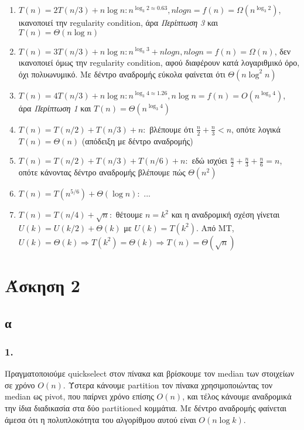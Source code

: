 \documentclass[12pt,a4paper]{article}
\begin{document}
    \begin{enumerate}
      \item \( T(n) = 2T(n/3) + n\log{n} : n^{\log_{3}2 \approx 0.63 }, 
      nlogn = f(n) = \Omega(n^{\log_{3}2}) \), ικανοποιεί την {\latintext 
      regularity condition}, άρα \textit{Περίπτωση 3} και \( T(n)=\Theta(n\log{n}) \)
      \item \( T(n) = 3T(n/3) + n\log{n} : n^{\log_{3}3} + nlogn, nlogn = 
      f(n) = \Omega(n) \), δεν ικανοποιεί όμως την {\latintext regularity 
      condition}, αφού διαφέρουν κατά λογαριθμικό όρο, όχι πολυωνυμικό. Με δέντρο αναδρομής εύκολα φαίνεται ότι \( \Theta(n\log^{2}{n}) \)
      \item \( T(n) = 4T(n/3) + n\log{n} : n^{\log_{3}{4} \approx 1.26}, n\log{n} =
      f(n) = O(n^{\log_{3}4}) \), άρα \textit{Περίπτωση 1} και \( Τ(n) = \Theta(n^{\log_{3}{4}}) \)
      \item \( T(n) = T(n/2) + T(n/3) + n : \) βλέπουμε ότι \( \frac{n}{2} + 
      \frac{n}{3} < n \), οπότε λογικά \( T(n) = \Theta(n) \) (απόδειξη με δέντρο αναδρομής)
      \item \( Τ(n) = T(n/2) + T(n/3) + T(n/6) + n : \) εδώ ισχύει \( \frac{n}{2} 
      + \frac{n}{3} + \frac{n}{6} = n \), οπότε κάνοντας δέντρο αναδρομής βλέπουμε
      πώς \( \Theta(n^2) \) 
      \item \( T(n) = T(n^{5/6}) + \Theta(\log{n}) : \) ...
      \item \( T(n) = T(n/4) + \sqrt{n} : \) θέτουμε \(n=k^2\) και η αναδρομική 
      σχέση γίνεται \( U(k) = U(k/2) + \Theta(k) \) με \( U(k)=T(k^2) \). Από 
      {\latintext MT}, \( U(k)=\Theta(k) \Rightarrow T(k^2)=\Theta(k) \Rightarrow 
      T(n)=\Theta(\sqrt{n}) \)
    \end{enumerate}

  \section{Άσκηση 2}

  \subsection{α}

  \subsubsection{1.}
    Πραγματοποιούμε {\latintext quickselect} στον πίνακα και βρίσκουμε τον
     {\latintext median} των στοιχείων σε χρόνο \( Ο(n) \).
    Ύστερα κάνουμε {\latintext partition} τον πίνακα χρησιμοποιώντας τον
     {\latintext median} ως {\latintext pivot}, που παίρνει χρόνο επίσης \( Ο(n) \), και τέλος κάνουμε αναδρομικά την ίδια διαδικασία στα δύο {\latintext partitioned} κομμάτια.
    Με δέντρο αναδρομής φαίνεται άμεσα ότι η πολυπλοκότητα του αλγορίθμου
     αυτού είναι \( Ο(n\log{k}) \).
\end{document}
